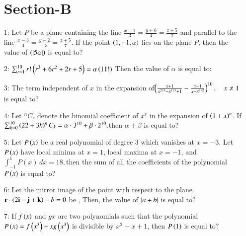 \documentclass[journal,12pt,twocolumn]{IEEEtran}
\theoremstyle{remark}
\begin{document}
\begin{enumerate}
\section{Section-B}
\item[1:] Let $ P $ be a plane containing the line 
$\frac{x - 1}{3} = \frac{y + 6}{4} = \frac{z + 5}{2}$
and parallel to the line $\frac{x - 3}{4} = \frac{y - 2}{-3} = \frac{z + 5}{7}.$ If the point $\left(1, -1, \alpha\right)$ lies on the plane $P$, then the value of $\left(\left\vert5\alpha\right\vert\right)$ is equal to?\vspace{1mm}\\
\item[2:]$ \sum_{r=1}^{10} r! \left(r^3 + 6r^2 + 2r + 5\right) = \alpha\left(11!\right)$
Then the value of $\alpha$ is equal to:\vspace{1mm}\\
\item[3:]The term independent of $x$ in the expansion of$\left(\frac{x + 1}{x^{2/3} - x^{1/3} + 1} - \frac{x - 1}{x - x^{1/2}}\right)^{10}, \quad x \neq 1$ is equal to?\vspace{1mm} \\ 
\item[4:]  Let $^nC_r$ denote the binomial coefficient of $x^r$ in the expansion of $\left(1 + x\right)^n$. If $\sum_{k=0}^{10} \left(22 + 3k\right)   ^nC_k = \alpha \cdot 3^{10} + \beta \cdot 2^{10},$then $\alpha + \beta$ is equal to?\vspace{1mm}\\
\item[5:]Let $P\left(x\right)$ be a real polynomial of degree 3 which vanishes at $x = -3$. Let $P\left(x\right)$ have local minima at $x = 1$, local maxima at $x = -1$, and $\int_{-1}^{1} P(x) \, dx = 18,$then the sum of all the coefficients of the polynomial $P\left(x\right)$ is equal to?\vspace{1mm}\\
\item[6:] Let the mirror image of the point  with respect to the plane $\mathbf{r} \cdot \left(2\mathbf{i} - \mathbf{j} + \mathbf{k}\right) - b = 0$ be , Then, the value of $\left\vert a + b\right\vert$ is equal to?\vspace{1mm}\\
\item[7:] If $f\left(x\right)$ and $g{x}$ are two polynomials such that the polynomial $P\left(x\right) = f\left(x^3\right) + x g\left(x^3\right)$ is divisible by $x^2 + x + 1$, then $P\left(1\right)$ is equal to?\vspace{1mm}\\

\end{enumerate}
\end{document}
